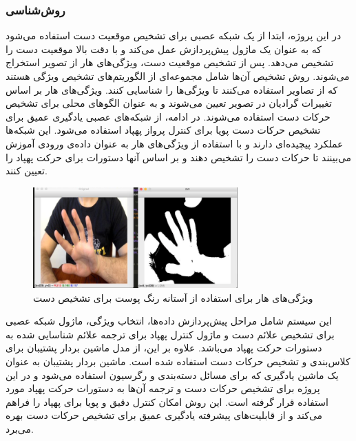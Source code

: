 \subsubsection{\protect\textbf{روش‌شناسی}}
در این پروژه، ابتدا از یک شبکه عصبی برای تشخیص موقعیت دست استفاده می‌شود که به عنوان یک ماژول پیش‌پردازش عمل می‌کند و با دقت بالا موقعیت دست را تشخیص می‌دهد. پس از تشخیص 
موقعیت دست، ویژگی‌های هار از تصویر استخراج می‌شوند. روش تشخیص آن‌ها شامل مجموعه‌ای از الگوریتم‌های تشخیص ویژگی هستند که از تصاویر استفاده می‌کنند تا ویژگی‌ها را 
شناسایی کنند. ویژگی‌های هار بر اساس تغییرات گرادیان در تصویر تعیین می‌شوند و به عنوان الگوهای محلی برای تشخیص حرکات دست استفاده می‌شوند. در ادامه، از شبکه‌های عصبی یادگیری 
عمیق برای تشخیص حرکات دست پویا برای کنترل پرواز پهپاد استفاده می‌شود. این شبکه‌ها عملکرد پیچیده‌ای دارند و با استفاده از ویژگی‌های هار به عنوان داده‌ی ورودی آموزش می‌بینند تا حرکات دست را 
تشخیص دهند و بر اساس آنها دستورات برای حرکت پهپاد را تعیین کنند.
\begin{figure}[h]
    \centering
    \includegraphics[width=0.7\textwidth]{Haar3.png}
    \caption[ویژگی‌های هار برای استفاده از آستانه رنگ پوست برای تشخیص دست]{ ویژگی‌های هار برای استفاده از آستانه رنگ پوست برای تشخیص دست \cite{natarajan2018hand}}
\end{figure}

این سیستم شامل مراحل پیش‌پردازش داده‌ها، انتخاب ویژگی، ماژول شبکه عصبی برای تشخیص علائم دست و ماژول کنترل پهپاد برای ترجمه 
علائم‌ شناسایی شده به دستورات حرکت پهپاد می‌باشد. علاوه بر این، از مدل ماشین بردار پشتیبان برای کلاس‌بندی و تشخیص حرکات دست استفاده شده است. ماشین بردار پشتیبان به عنوان یک ماشین یادگیری 
 که برای مسائل دسته‌بندی و رگرسیون استفاده می‌شود و در این پروژه برای تشخیص حرکات دست و ترجمه آن‌ها به دستورات حرکت پهپاد مورد استفاده قرار گرفته است. این روش امکان 
کنترل دقیق و پویا برای پهپاد را فراهم می‌کند و از قابلیت‌های پیشرفته یادگیری عمیق برای تشخیص حرکات دست بهره می‌برد.

